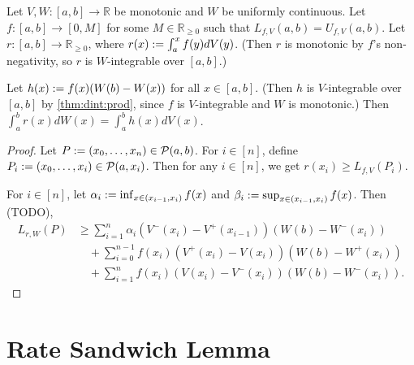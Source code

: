 \documentclass[a4paper,12pt,fleqn]{article}
\begin{document}
\begin{lemma}
Let $V, W: [a, b] \to \mathbb{R}$ be monotonic and $W$ be uniformly continuous.
Let $f: [a, b] \to [0, M]$ for some $M \in \mathbb{R}_{\ge 0}$
such that $L_{f,V}(a, b) = U_{f,V}(a, b)$.
Let $r: [a, b] \to \mathbb{R}_{\ge 0}$, where
$r(x) := \int_a^x f(y)dV(y)$.
(Then $r$ is monotonic by $f$'s non-negativity,
so $r$ is $W$-integrable over $[a, b]$.)

Let $h(x) := f(x)(W(b)-W(x))$ for all $x \in [a, b]$.
(Then $h$ is $V$-integrable over $[a, b]$ by \cref{thm:dint:prod},
since $f$ is $V$-integrable and $W$ is monotonic.)
Then $\int_a^b r(x)dW(x) = \int_a^b h(x)dV(x)$.
\end{lemma}
\begin{proof}
Let $P := (x_0, \ldots, x_n) \in \mathcal{P}(a, b)$.
For $i \in [n]$, define $P_i := (x_0, \ldots, x_i) \in \mathcal{P}(a, x_i)$.
Then for any $i \in [n]$, we get $r(x_i) \ge L_{f,V}(P_i)$.

For $i \in [n]$, let $\alpha_i := \inf_{x \in (x_{i-1}, x_i)} f(x)$
and $\beta_i := \sup_{x \in (x_{i-1}, x_i)} f(x)$.
%
Then (TODO),
\begin{align*}
L_{r,W}(P) &\ge \sum_{i=1}^n \alpha_i(V^-(x_i)-V^+(x_{i-1}))(W(b)-W^-(x_i))
    \\ &\quad + \sum_{i=0}^{n-1} f(x_i)(V^+(x_i)-V(x_i))(W(b)-W^+(x_i))
    \\ &\quad + \sum_{i=1}^n f(x_i)(V(x_i)-V^-(x_i))(W(b)-W^-(x_i)).
\end{align*}
\end{proof}

\section{Rate Sandwich Lemma}
\end{document}
